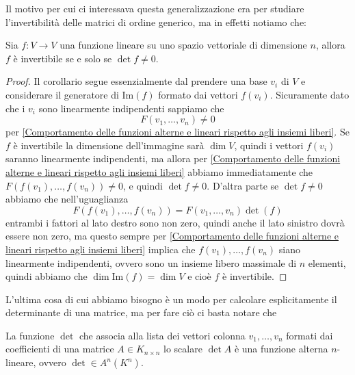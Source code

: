 \documentclass[11pt]{scrartcl}
\newcommand{\Immagine}[1]{\text{Im}\left(#1\right)}
\begin{document}
   	 Il motivo per cui ci interessava questa generalizzazione era per studiare l'invertibilità delle matrici di ordine generico, ma in effetti notiamo che:
   	 \begin{corollary}
   	 	Sia $f:V\to V$ una funzione lineare su uno spazio vettoriale di dimensione $n$, allora $f$ è invertibile se e solo se $\det f \ne 0$.
   	 \end{corollary}
   	 \begin{proof}
   	 	Il corollario segue essenzialmente dal prendere una base $v_i$ di $V$ e considerare il generatore di $\Immagine{f}$ formato dai vettori $f(v_i)$. Sicuramente dato che i $v_i$ sono linearmente indipendenti sappiamo che
   	 	$$F(v_1,\dots,v_n)\ne 0$$
   	 	per \ref{Comportamento delle funzioni alterne e lineari rispetto agli insiemi liberi}.
   	 	Se $f$ è invertibile la dimensione dell'immagine sarà $\dim V$, quindi i vettori $f(v_i)$ saranno linearmente indipendenti, ma allora per \ref{Comportamento delle funzioni alterne e lineari rispetto agli insiemi liberi}
 		abbiamo immediatamente che $F(f(v_1),\dots,f(v_n))\ne 0$, e quindi $\det f \ne 0$. D'altra parte se $\det f \ne 0$ abbiamo che nell'uguaglianza
 		$$F(f(v_1),\dots,f(v_n))=F(v_1,\dots,v_n)\det(f)$$
 		entrambi i fattori al lato destro sono non zero, quindi anche il lato sinistro dovrà essere non zero, ma questo sempre per \ref{Comportamento delle funzioni alterne e lineari rispetto agli insiemi liberi} implica che $f(v_1),\dots,f(v_n)$ siano linearmente indipendenti, ovvero sono un insieme libero massimale di $n$ elementi, quindi abbiamo che $\dim\Immagine{f}=\dim V$ e cioè $f$ è invertibile.
   	 \end{proof}
   	 L'ultima cosa di cui abbiamo bisogno è un modo per calcolare esplicitamente il determinante di una matrice, ma per fare ciò ci basta notare che 
   	 \begin{lemma}\label{il determinante è alterno e multilineare}
   	 	La funzione $\det$ che associa alla lista dei vettori colonna $v_1,\dots,v_n$ formati dai coefficienti di una matrice $A\in K_{n\times n}$ lo scalare $\det A$ è una funzione alterna $n$-lineare, ovvero $\det\in A^n(K^n)$. 
   	 \end{lemma}
\end{document}
